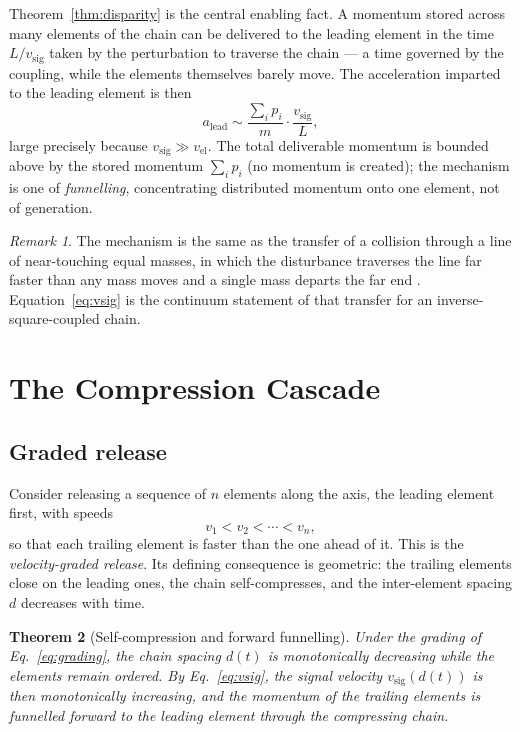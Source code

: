 \documentclass[twocolumn,10pt,a4paper]{article}
\theoremstyle{thmstyle}
\newtheorem{theorem}{Theorem}[section]
\theoremstyle{definition}
\theoremstyle{remark}
\newtheorem{remark}[theorem]{Remark}
\newcommand{\vsig}{v_{\mathrm{sig}}}
\newcommand{\vnode}{v_{\mathrm{el}}}
\begin{document}
Theorem~\ref{thm:disparity} is the central enabling fact. A momentum stored
across many elements of the chain can be delivered to the leading element in
the time $L/\vsig$ taken by the perturbation to traverse the chain --- a time
governed by the coupling, while the elements themselves barely move. The
acceleration imparted to the leading element is then
\begin{equation}
a_{\mathrm{lead}} \sim \frac{\sum_i p_i}{m}\cdot\frac{\vsig}{L},
\label{eq:lead-accel}
\end{equation}
large precisely because $\vsig\gg\vnode$. The total deliverable momentum is
bounded above by the stored momentum $\sum_i p_i$ (no momentum is created);
the mechanism is one of \emph{funnelling}, concentrating distributed momentum
onto one element, not of generation.

\begin{remark}
The mechanism is the same as the transfer of a collision through a line of
near-touching equal masses, in which the disturbance traverses the line far
faster than any mass moves and a single mass departs the far end
\citep{hutzler2004}. Equation~\eqref{eq:vsig} is the continuum statement of
that transfer for an inverse-square-coupled chain.
\end{remark}

\section{The Compression Cascade}
\label{sec:cascade}

\subsection{Graded release}

Consider releasing a sequence of $n$ elements along the axis, the leading
element first, with speeds
\begin{equation}
v_1 < v_2 < \cdots < v_n ,
\label{eq:grading}
\end{equation}
so that each trailing element is faster than the one ahead of it. This is the
\emph{velocity-graded release}. Its defining consequence is geometric: the
trailing elements close on the leading ones, the chain self-compresses, and
the inter-element spacing $d$ decreases with time.

\begin{theorem}[Self-compression and forward funnelling]
\label{thm:cascade}
Under the grading of Eq.~\eqref{eq:grading}, the chain spacing $d(t)$ is
monotonically decreasing while the elements remain ordered. By
Eq.~\eqref{eq:vsig}, the signal velocity $\vsig(d(t))$ is then monotonically
increasing, and the momentum of the trailing elements is funnelled forward to
the leading element through the compressing chain.
\end{theorem}
\end{document}
